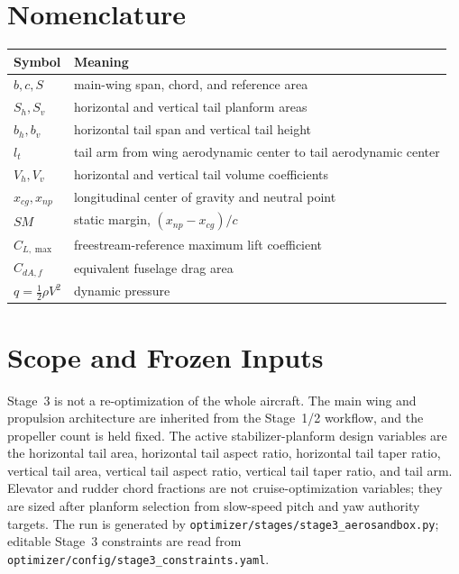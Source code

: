 \documentclass[11pt]{article}
\begin{document}
\section*{Nomenclature}
\begin{longtable}{@{}ll@{}}
\toprule
Symbol & Meaning \\
\midrule
\(b,c,S\) & main-wing span, chord, and reference area \\
\(S_h,S_v\) & horizontal and vertical tail planform areas \\
\(b_h,b_v\) & horizontal tail span and vertical tail height \\
\(l_t\) & tail arm from wing aerodynamic center to tail aerodynamic center \\
\(V_h,V_v\) & horizontal and vertical tail volume coefficients \\
\(x_{cg},x_{np}\) & longitudinal center of gravity and neutral point \\
\(SM\) & static margin, \((x_{np}-x_{cg})/c\) \\
\(C_{L,\max}\) & freestream-reference maximum lift coefficient \\
\(C_{dA,f}\) & equivalent fuselage drag area \\
\(q=\frac{1}{2}\rho V^2\) & dynamic pressure \\
\bottomrule
\end{longtable}

\section{Scope and Frozen Inputs}
Stage~3 is not a re-optimization of the whole aircraft. The main wing and propulsion architecture are inherited from the Stage~1/2 workflow, and the propeller count is held fixed. The active stabilizer-planform design variables are the horizontal tail area, horizontal tail aspect ratio, horizontal tail taper ratio, vertical tail area, vertical tail aspect ratio, vertical tail taper ratio, and tail arm. Elevator and rudder chord fractions are not cruise-optimization variables; they are sized after planform selection from slow-speed pitch and yaw authority targets. The run is generated by \texttt{optimizer/stages/stage3\_aerosandbox.py}; editable Stage~3 constraints are read from \texttt{optimizer/config/stage3\_constraints.yaml}.
\end{document}
